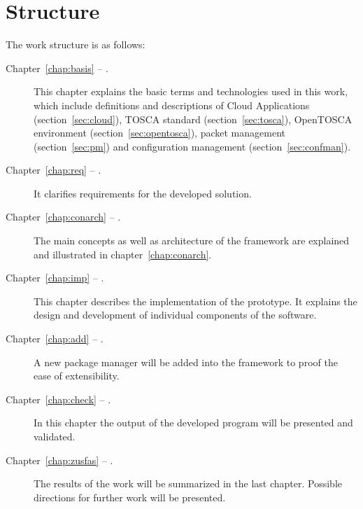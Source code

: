 \section*{Structure}
The work structure is as follows:
\begin{description}
\item[Chapter~\ref{chap:basis} -- .] This chapter explains the basic terms and technologies used in this work, which include definitions and descriptions of Cloud Applications (section~\ref{sec:cloud}), TOSCA standard (section~\ref{sec:tosca}), OpenTOSCA environment  (section~\ref{sec:opentosca}), packet management (section~\ref{sec:pm}) and configuration management (section~\ref{sec:confman}).
\item[Chapter~\ref{chap:req} -- .] It clarifies requirements for the developed solution.
\item[Chapter~\ref{chap:conarch} -- .] The main concepts as well as architecture of the framework are explained and illustrated in chapter~\ref{chap:conarch}.
\item[Chapter~\ref{chap:imp} -- .] This chapter describes the implementation of the prototype.
 It explains the design and development of individual components of the software. 
\item[Chapter~\ref{chap:add} -- .] A new package manager will be added into the framework to proof the ease of extensibility. 
\item[Chapter~\ref{chap:check} -- .] In this chapter the output of the developed program will be presented and validated.
\item[Chapter~\ref{chap:zusfas} -- .] The results of the work will be summarized in the last chapter. 
	Possible directions for further work will be presented.
\end{description}

